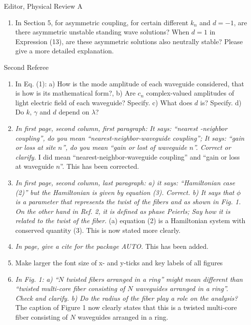 \documentclass[11pt]{letter}
\begin{document}
\begin{letter}{Editor, Physical Review A}
\begin{enumerate}
\item In Section 5, for asymmetric coupling, for certain different $k_{n}$ and $d=-1$, are there asymmetric unstable standing wave solutions? When $d=1$ in Expression (13), are these asymmetric solutions also neutrally stable? Please give a more detailed explanation.

\end{enumerate}

Second Referee
\begin{enumerate}
\item In Eq. (1): a) How is the mode amplitude of each waveguide considered, that is how is its mathematical form?, b) Are $c_n$ complex-valued amplitudes of light electric field of each waveguide? Specify. c) What does $d$ is? Specify. d) Do $k$, $\gamma$ and $d$ depend on $\lambda$?

\item \emph{In first page, second column, first paragraph: It says: ``nearest -neighbor coupling'', do you mean ``nearest-neighbor-waveguide coupling''; It says: ``gain or loss at site $n$'', do you mean ``gain or lost of waveguide $n$''. Correct or clarify.} I did mean ``nearest-neighbor-waveguide coupling'' and ``gain or loss at waveguide $n$''. This has been corrected.

\item \emph{In first page, second column, last paragraph: a) it says: ``Hamiltonian case (2)'' but the Hamiltonian is given by equation (3). Correct. b) It says that $\phi$ is a parameter that represents the twist of the fibers and as shown in Fig. 1. On the other hand in Ref. 2, it is defined as phase Peierls; Say how it is related to the twist of the fiber.} (a) equation (2) is a Hamiltonian system with conserved quantity (3). This is now stated more clearly.

\item \emph{In page, give a cite for the package AUTO.} This has been added.

\item Make larger the font size of x- and y-ticks and key labels of all figures

\item \emph{In Fig. 1: a) ``$N$ twisted fibers arranged in a ring'' might mean different than ``twisted multi-core fiber consisting of $N$ waveguides arranged in a ring''. Check and clarify. b) Do the radius of the fiber play a role on the analysis?} The caption of Figure 1 now clearly states that this is a twisted multi-core fiber consisting of $N$ waveguides arranged in a ring.


\end{enumerate}
\end{letter}
\end{document}
